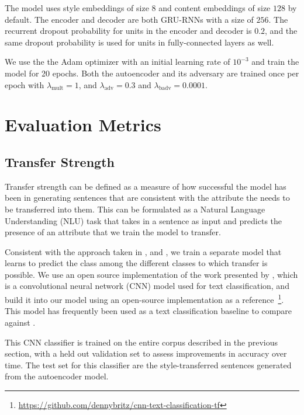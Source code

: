 The model uses style embeddings of size $8$ and content embeddings of size $128$ by default. The encoder and decoder are both GRU-RNNs with a size of $256$. The recurrent dropout probability for units in the encoder and decoder is $0.2$, and the same dropout probability is used for units in fully-connected layers as well.

We use the the Adam optimizer \citep{kingma2014adam} with an initial learning rate of $10^{-3}$ and train the model for 20 epochs. Both the autoencoder and its adversary are trained once per epoch with $\lambda_\text{mult} = 1$, and $\lambda_\text{adv} = 0.3$ and $\lambda_\text{badv} = 0.0001$.


\section{Evaluation Metrics} \label{sec:evaluation-metrics}

\subsection{Transfer Strength}

Transfer strength can be defined as a measure of how successful the model has been in generating sentences that are consistent with the attribute the needs to be transferred into them. This can be formulated as a Natural Language Understanding (NLU) task that takes in a sentence as input and predicts the presence of an attribute that we train the model to transfer.

Consistent with the approach taken in \cite{hu2017toward}, \cite{shen2017style} and \cite{fu2017style}, we train a separate model that learns to predict the class among the different classes to which transfer is possible. We use an open source implementation of the work presented by \cite{kim2014convolutional}, which is a convolutional neural network (CNN) model used for text classification, and build it into our model using an open-source implementation as a reference~\footnote{\url{https://github.com/dennybritz/cnn-text-classification-tf}}. This model has frequently been used as a text classification baseline to compare against \citep{tai2015improved} \citep{kiros2015skip} \citep{zhang2015character}.

This CNN classifier is trained on the entire corpus described in the previous section, with a held out validation set to assess improvements in accuracy over time. The test set for this classifier are the style-transferred sentences generated from the autoencoder model.

